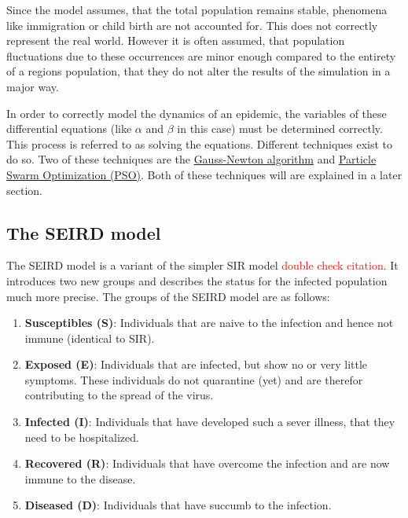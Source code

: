 Since the model assumes, that the total population remains stable, phenomena like immigration or child birth are not accounted
for. This does not correctly represent the real world. However it is often assumed, that population fluctuations
due to these occurrences are minor enough compared to the entirety of a regions population, that they do not alter the results of the
simulation in a major way\cite{??}.\newline

\par
In order to correctly model the dynamics of an epidemic, the variables of these differential
equations (like $\alpha$ and $\beta$ in this case) must be determined correctly. This process is referred to as solving the equations.
Different techniques exist to do so. Two of these techniques are the \hyperref[sec:Gauss]{Gauss-Newton algorithm}\cite{Gauss??} and
\hyperref[sec:PSO]{Particle Swarm Optimization (PSO)}\cite{PSO??}. Both of these techniques will are explained in a later section.



\subsection{The SEIRD model}
\label{sec:SEIRD}
The SEIRD model is a variant of the simpler SIR model\cite{knowdel20173d}
\textcolor{red}{double check citation}. %
It introduces two new groups and describes the status for the infected population much more precise. The groups of the SEIRD
model are as follows:

\begin{enumerate}[label=$\bullet$]
	\item \textbf{Susceptibles (S)}: Individuals that are naive to the infection and hence not immune (identical to SIR).
	\item \textbf{Exposed (E)}: Individuals that are infected, but show no or very little symptoms. These individuals
		do not quarantine (yet) and are therefor contributing to the spread of the virus.
	\item \textbf{Infected (I)}: Individuals that have developed such a sever illness, that they need to be hospitalized.
	\item \textbf{Recovered (R)}: Individuals that  have overcome the infection and are now immune to the disease.
	\item \textbf{Diseased (D)}: Individuals that have succumb to the infection.
\end{enumerate}


